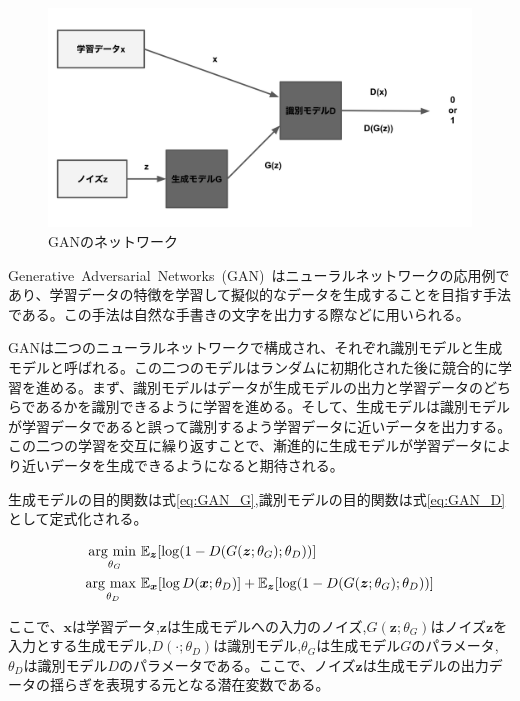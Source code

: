 \begin{figure}[t]
\begin{center}
\includegraphics[width=\hsize]{figure/GAN_net.png}
\caption{GANのネットワーク}
\label{fig:GAN_net}
\end{center}
\end{figure}


Generative~Adversarial~Networks~(GAN)~\cite{GAN}はニューラルネットワークの応用例であり、学習データの特徴を学習して擬似的なデータを生成することを目指す手法である。この手法は自然な手書きの文字を出力する際などに用いられる。

GANは二つのニューラルネットワークで構成され、それぞれ識別モデルと生成モデルと呼ばれる。この二つのモデルはランダムに初期化された後に競合的に学習を進める。まず、識別モデルはデータが生成モデルの出力と学習データのどちらであるかを識別できるように学習を進める。そして、生成モデルは識別モデルが学習データであると誤って識別するよう学習データに近いデータを出力する。この二つの学習を交互に繰り返すことで、漸進的に生成モデルが学習データにより近いデータを生成できるようになると期待される。

生成モデルの目的関数は式\ref{eq:GAN_G},識別モデルの目的関数は式\ref{eq:GAN_D}として定式化される。

\begin{align}
    \label{eq:GAN_G}
    \mathop{\rm arg~min~}\limits _{\theta_G}& \mathbb{E}_{\boldsymbol{z}}[\log (1-D(G(\boldsymbol{z};\theta_G);\theta_D))]\\
    \label{eq:GAN_D}
    \mathop{\rm arg~max~}\limits _{\theta_D}& \mathbb{E}_{\boldsymbol{x}}[\log D(\boldsymbol{x};\theta_D)]+\mathbb{E}_{\boldsymbol{z}}[\log (1-D(G(\boldsymbol{z};\theta_G);\theta_D))]
\end{align}


ここで、$\boldsymbol{x}$は学習データ,$\boldsymbol{z}$は生成モデルへの入力のノイズ,$G(\boldsymbol{z};\theta_G)$はノイズ$\boldsymbol{z}$を入力とする生成モデル,$D(\cdot;\theta_D)$は識別モデル,$\theta_G$は生成モデル$G$のパラメータ,$\theta_D$は識別モデル$D$のパラメータである。ここで、ノイズ$\boldsymbol{z}$は生成モデルの出力データの揺らぎを表現する元となる潜在変数である。

